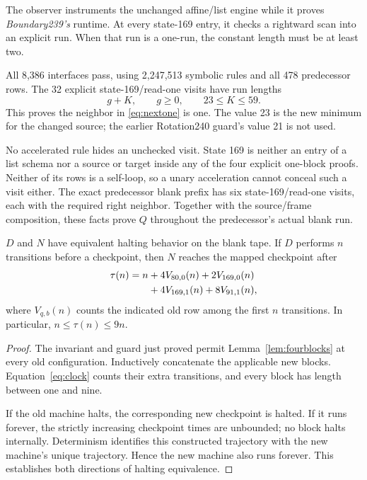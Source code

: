 The observer  instruments
the unchanged affine/list engine while it proves \emph{Boundary239's}
runtime. At every state-169 entry, it checks a rightward scan into
an explicit run. When that run is a one-run, the constant length
must be at least two.

All 8,386 interfaces pass, using 2,247,513 symbolic rules and all
478 predecessor rows. The 32 explicit state-169/read-one visits
have run lengths
\[
 g+K,\qquad g\ge0,\qquad 23\le K\le59.
\]
This proves the neighbor in \eqref{eq:nextone} is one. The value
23 is the new minimum for the changed source; the earlier
Rotation240 guard's value 21 is not used.

No accelerated rule hides an unchecked visit. State 169 is
neither an entry of a list schema nor a source or target inside
any of the four explicit one-block proofs. Neither of its rows
is a self-loop, so a unary acceleration cannot conceal such a
visit either. The exact predecessor blank prefix has six
state-169/read-one visits, each with the required right neighbor.
Together with the source/frame composition, these facts prove
$Q$ throughout the predecessor's actual blank run.

\begin{theorem}
\label{thm:fold}
$D$ and $N$ have equivalent halting behavior on the blank tape.
If $D$ performs $n$ transitions before a checkpoint, then $N$
reaches the mapped checkpoint after
\begin{align}
 \tau(n)=n
 &+4V_{80,0}(n)+2V_{169,0}(n)\notag\\
 &+4V_{169,1}(n)+8V_{91,1}(n), \label{eq:clock}
\end{align}
where $V_{q,b}(n)$ counts the indicated old row among the first
$n$ transitions. In particular, $n\le\tau(n)\le9n$.
\end{theorem}
\begin{proof}
The invariant and guard just proved permit
Lemma~\ref{lem:fourblocks} at every old configuration. Inductively
concatenate the applicable new blocks. Equation~\eqref{eq:clock}
counts their extra transitions, and every block has length
between one and nine.

If the old machine halts, the corresponding new checkpoint is
halted. If it runs forever, the strictly increasing checkpoint
times are unbounded; no block halts internally. Determinism
identifies this constructed trajectory with the new machine's
unique trajectory. Hence the new machine also runs forever.
This establishes both directions of halting equivalence.
\end{proof}

